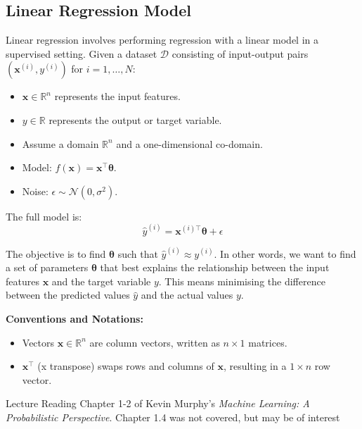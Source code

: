 \subsection{Linear Regression Model}

Linear regression involves performing regression with a linear model in a supervised setting. Given a dataset \(\mathcal{D}\) consisting of input-output pairs \((\bm{x}^{(i)}, y^{(i)})\) for \(i = 1, \ldots, N\):
\begin{itemize}[noitemsep]
    \item \(\bm{x} \in \mathbb{R}^n\) represents the input features.
    \item \(y \in \mathbb{R}\) represents the output or target variable.
    \item Assume a domain \(\mathbb{R}^n\) and a one-dimensional co-domain.
    \item Model: \(f(\bm{x}) = \bm{x}^\top \bm{\theta}\).
    \item Noise: \(\epsilon \sim \mathcal{N}(0, \sigma^2)\).
\end{itemize}
The full model is:
\[
\hat{y}^{(i)} = \bm{x}^{(i)\top} \bm{\theta} + \epsilon
\]

The objective is to find \(\bm{\theta}\) such that \(\hat{y}^{(i)} \approx y^{(i)}\). In other words, we want to find a set of parameters \(\bm{\theta}\) that best explains the relationship between the input features \(\bm{x}\) and the target variable \(y\). This means minimising the difference between the predicted values \(\hat{y}\) and the actual values \(y\).\bigskip

\textbf{Conventions and Notations:}
\begin{itemize}[noitemsep]
    \item Vectors \(\bm{x} \in \mathbb{R}^n\) are column vectors, written as \(n \times 1\) matrices.
    \item \(\bm{x}^\top\) (x transpose) swaps rows and columns of \(\bm{x}\), resulting in a \(1 \times n\) row vector.
\end{itemize}




\begin{referencebox}{Lecture Reading}
    Chapter 1-2 of Kevin Murphy's \textit{Machine Learning: A Probabilistic Perspective}. Chapter 1.4 was not covered, but may be of interest
\end{referencebox}




